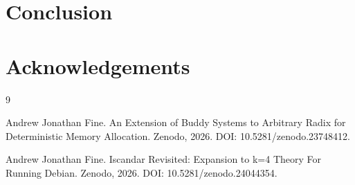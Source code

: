 \documentclass[11pt]{article}
\begin{document}
\section{Conclusion}

\section*{Acknowledgements}

\begin{thebibliography}{9}

Andrew Jonathan Fine.
\newblock An Extension of Buddy Systems to Arbitrary Radix for
Deterministic Memory Allocation.
\newblock Zenodo, 2026.
\newblock DOI: 10.5281/zenodo.23748412.

Andrew Jonathan Fine.
\newblock Iscandar Revisited: Expansion to k=4 Theory For Running Debian.
\newblock Zenodo, 2026.
\newblock DOI: 10.5281/zenodo.24044354.

\end{thebibliography}
\end{document}

